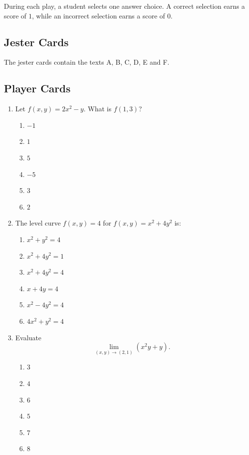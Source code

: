 \documentclass[a4paper,12pt]{article}
\theoremstyle{mystyle}
\numberwithin{equation}{section}
\numberwithin{theorem}{section}
\numberwithin{proposition}{section}
\numberwithin{example}{section}
\numberwithin{remark}{section}
\numberwithin{lemma}{section}
\numberwithin{corollary}{section}
\numberwithin{definition}{section}
\begin{document}
During each play, a student selects one answer choice.
A correct selection earns a score of $1$, while an
incorrect selection earns a score of $0$.


\subsection{Jester Cards}

The jester cards contain the texts A, B, C, D, E and F.

\subsection{Player Cards}

\begin{enumerate}[label=\textbf{Question \arabic*.}, leftmargin=*]

\item Let \(f(x,y)=2x^{2}-y\). What is \(f(1,3)\)?
\begin{enumerate}[label=(\Alph*)]
\item \(-1\)
\item \(1\)
\item \(5\)
\item \(-5\)
\item \(3\)
\item \(2\)
\end{enumerate}

\item The level curve \(f(x,y)=4\) for \(f(x,y)=x^{2}+4y^{2}\) is:
\begin{enumerate}[label=(\Alph*)]
\item \(x^{2}+y^{2}=4\)
\item \(x^{2}+4y^{2}=1\)
\item \(x^{2}+4y^{2}=4\)
\item \(x+4y=4\)
\item \(x^{2}-4y^{2}=4\)
\item \(4x^{2}+y^{2}=4\)
\end{enumerate}

\item Evaluate
\[
\lim_{(x,y)\to(2,1)}(x^{2}y+y).
\]
\begin{enumerate}[label=(\Alph*)]
\item \(3\)
\item \(4\)
\item \(6\)
\item \(5\)
\item \(7\)
\item \(8\)
\end{enumerate}


\end{enumerate}
\end{document}

